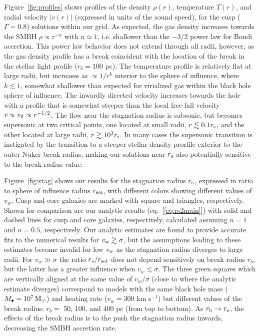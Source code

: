\documentclass[usenatbib,fleqn]{mn2e}
\newcommand{\rs}{r_s}
\newcommand{\rb}{r_b}
\newcommand{\Mbh}[1][]{M_{\bullet#1}}
\newcommand{\soi}{\rm soi}
\newcommand{\rsoi}{r_{\soi}}
\begin{document}
Figure~\ref{fig:profiles} shows profiles of the density $\rho(r)$,
temperature $T(r)$, and radial velocity $|v(r)|$ (expressed in units of the sound speed), for the cusp
($\Gamma=0.8$) solutions within our grid.  As expected, the gas
density increases towards the SMBH $\rho\propto r^{-n}$ with
$n\simeq1$, i.e. shallower than the $-3/2$ power law for
Bondi accretion. This power law behavior does not extend
through all radii, however, as the gas density profile has a break coincident
with the location of the break in the stellar light profile ($\rb=100$
pc). The temperature profile is relatively flat at large radii, but
increases as $\propto 1/r^{k}$ interior to the sphere of influence,
where $k\lesssim 1$, somewhat shallower than expected for virialized gas within the black hole sphere of influence.
The inwardly directed velocity increases towards the hole with a profile that is somewhat steeper than the local free-fall velocity $v \propto v_{\rm ff}\propto r^{-1/2}$.  The flow near the stagnation radius is subsonic, but becomes supersonic at two critical points, one located at small radii, $r \lesssim 0.1r_{\rm s}$, and the other located at large radii, $r \gtrsim 10^{3}r_{\rm s}$.  In many cases the supersonic transition is instigated by the transition to a steeper stellar density prorfile exterior to the outer Nuker break radius, making our solutions near $r_{\rm s}$ also potentially sensitive to the break radius value.

Figure~\ref{fig:stag} shows our results for the stagnation radius $r_{\rm s}$, expressed in ratio to sphere of influence radius $r_{\rm soi}$, with different colors showing different values of $v_{w}$.  Cusp and core galaxies are marked with square and triangles, respectively.  Shown for comparison are our analytic results (eq.~[\ref{eq:rs2main}]) with solid and dashed lines for cusp and core galaxies, respectively, calculated assuming $n = 1$ and $n= 0.5$, respectively.  Our analytic estimates are found to provide accurate fits to the numerical results for $v_{\rm w} \gtrsim \sigma$, but the assumptions leading to these estimates become invalid for low $v_{\rm w}$ as the stagnation radius diverges to large radii.  For $v_{w} \gg \sigma$ the ratio $\rs/\rsoi$ does not depend sensitively on break radius $r_{b}$, but the latter has a greater influence when $v_{w} \lesssim \sigma$.  The three green squares which are vertically aligned at the same value of $v_{w}/\sigma$ (close to where the analytic estimate diverges) correspond to models with the same black hole mass ($\Mbh = 10^7 \Msun$) and heating rate ($v_w = 300$ km s$^{-1}$) but different values of the break radius: $r_{b} = $ 50, 100, and 400 pc (from top to bottom).  As $r_{\rm b} \rightarrow r_{s}$, the effects of the break radius is to the push the stagnation radius inwards, decreasing the SMBH accretion rate.    
\end{document}
